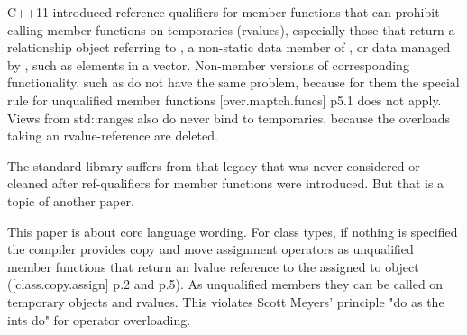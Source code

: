 \documentclass[ebook,11pt,article]{memoir}
\begin{document}
C++11 introduced reference qualifiers for member functions that can prohibit calling member functions on temporaries (rvalues), especially those that return a relationship object referring to , a non-static data member of , or data managed by , such as elements in a vector.
Non-member versions of corresponding functionality, such as  do not have the same problem, because for them the special rule for unqualified member functions [over.maptch.funcs] p5.1 does not apply. Views from std::ranges also do never bind to temporaries, because the overloads taking an rvalue-reference are deleted.

The standard library suffers from that legacy that was never considered or cleaned after ref-qualifiers for member functions were introduced. But that is a topic of another paper.

This paper is about core language wording. For class types, if nothing is specified the compiler provides copy and move assignment operators as unqualified member functions that return an lvalue reference to the assigned to object ([class.copy.assign] p.2 and p.5). As unqualified members they can be called on temporary objects and rvalues. This violates Scott Meyers' principle "do as the ints do" for operator overloading.
\end{document}
